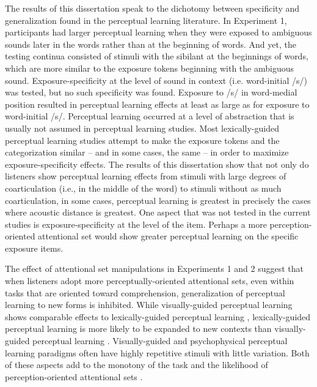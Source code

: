 The results of this dissertation speak to the dichotomy between specificity and generalization found in the perceptual learning literature. 
In Experiment 1, participants had larger perceptual learning when they were exposed to ambiguous sounds later in the words rather than at the beginning of words. 
And yet, the testing continua consisted of stimuli with the sibilant at the beginnings of words, which are more similar to the exposure tokens beginning with the ambiguous sound.
Exposure-specificity at the level of sound in context (i.e. word-initial /s/) was tested, but no such specificity was found.
Exposure to /s/ in word-medial position resulted in perceptual learning effects at least as large as for exposure to word-initial /s/.
Perceptual learning occurred at a level of abstraction that is usually not assumed in perceptual learning studies.
Most lexically-guided perceptual learning studies attempt to make the exposure tokens and the categorization similar -- and in some cases, the same -- in order to maximize exposure-specificity effects.
The results of this dissertation show that not only do listeners show perceptual learning effects from stimuli with large degrees of coarticulation (i.e., in the middle of the word) to stimuli without as much coarticulation, in some cases, perceptual learning is greatest in precisely the cases where acoustic distance is greatest.
One aspect that was not tested in the current studies is exposure-specificity at the level of the item.
Perhaps a more perception-oriented attentional set would show greater perceptual learning on the specific exposure items.

The effect of attentional set manipulations in Experiments 1 and 2 suggest that when listeners adopt more perceptually-oriented attentional sets, even within tasks that are oriented toward comprehension, generalization of perceptual learning to new forms is inhibited.
While visually-guided perceptual learning shows comparable effects to lexically-guided perceptual learning \citep{vanLinden2007}, lexically-guided perceptual learning is more likely to be expanded to new contexts  than visually-guided perceptual learning \citetext{\citealp{Norris2003, Kraljic2008a,Reinisch2014}, but see \citealp{Mitterer2013}}.
Visually-guided and psychophysical perceptual learning paradigms often have highly repetitive stimuli with little variation.  
Both of these aspects add to the monotony of the task and the likelihood of perception-oriented attentional sets \citep{Cutler1987}.

